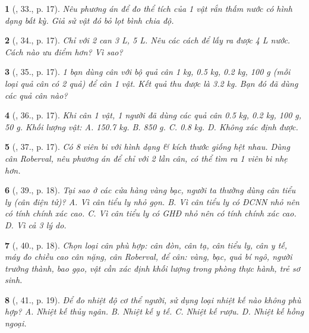 \documentclass{article}
\newtheorem{baitoan}{}
\begin{document}
\begin{baitoan}[\cite{ncpt_KHTN_6_tap_1}, 33., p. 17]
	Nêu phương án để đo thể tích của 1 vật rắn thấm nước có hình dạng bất kỳ. Giả sử vật đó bỏ lọt bình chia độ.
\end{baitoan}

\begin{baitoan}[\cite{ncpt_KHTN_6_tap_1}, 34., p. 17]
	Chỉ với 2 can {\rm3 L, 5 L}. Nêu các cách để lấy ra được {\rm4 L} nước. Cách nào ưu điểm hơn? Vì sao?
\end{baitoan}

\begin{baitoan}[\cite{ncpt_KHTN_6_tap_1}, 35., p. 17]
	1 bạn dùng cân với bộ quả cân {\rm1 kg, 0.5 kg, 0.2 kg, 100 g} (mỗi loại quả cân có 2 quả) để cân 1 vật. Kết quả thu được là {\rm3.2 kg}. Bạn đó đã dùng các quả cân nào?
\end{baitoan}

\begin{baitoan}[\cite{ncpt_KHTN_6_tap_1}, 36., p. 17]
	Khi cân 1 vật, 1 người đã dùng các quả cân {\rm0.5 kg, 0.2 kg, 100 g, 50 g}. Khối lượng vật: {\sf A.} {\rm150.7 kg}. {\sf B.} {\rm850 g}. {\sf C.} {\rm0.8 kg}. {\sf D.} Không xác định được.
\end{baitoan}

\begin{baitoan}[\cite{ncpt_KHTN_6_tap_1}, 37., p. 17]
	Có 8 viên bi với hình dạng \& kích thước giống hệt nhau. Dùng cân Roberval, nêu phương án để chỉ với 2 lần cân, có thể tìm ra 1 viên bi nhẹ hơn.
\end{baitoan}

\begin{baitoan}[\cite{ncpt_KHTN_6_tap_1}, 39., p. 18]
	Tại sao ở các cửa hàng vàng bạc, người ta thường dùng cân tiểu ly (cân điện tử)? {\sf A.} Vì cân tiểu ly nhỏ gọn. {\sf B.} Vì cân tiểu ly có {\rm ĐCNN} nhỏ nên có tính chính xác cao. {\sf C.} Vì cân tiểu ly có {\rm GHĐ} nhỏ nên có tính chính xác cao. {\sf D.} Vì cả 3 lý do.
\end{baitoan}

\begin{baitoan}[\cite{ncpt_KHTN_6_tap_1}, 40., p. 18]
	Chọn loại cân phù hợp: cân đòn, cân tạ, cân tiểu ly, cân y tế, máy đo chiều cao cân nặng, cân Roberval, để cân: vàng, bạc, quả bí ngô, người trưởng thành, bao gạo, vật cần xác định khối lượng trong phòng thực hành, trẻ sơ sinh.
\end{baitoan}

\begin{baitoan}[\cite{ncpt_KHTN_6_tap_1}, 41., p. 19]
	Để đo nhiệt độ cơ thể người, sử dụng loại nhiệt kế nào không phù hợp? {\sf A.} Nhiệt kế thủy ngân. {\sf B.} Nhiệt kế y tế. {\sf C.} Nhiệt kế rượu. {\sf D.} Nhiệt kế hồng ngoại.
\end{baitoan}
\end{document}

